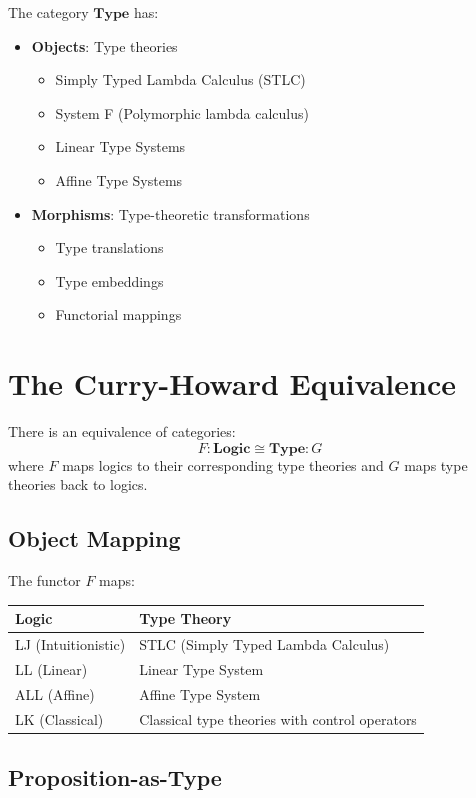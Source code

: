 The category $\mathbf{Type}$ has:
\begin{itemize}
    \item \textbf{Objects}: Type theories
    \begin{itemize}
        \item Simply Typed Lambda Calculus (STLC)
        \item System F (Polymorphic lambda calculus)
        \item Linear Type Systems
        \item Affine Type Systems
    \end{itemize}
    \item \textbf{Morphisms}: Type-theoretic transformations
    \begin{itemize}
        \item Type translations
        \item Type embeddings
        \item Functorial mappings
    \end{itemize}
\end{itemize}

\section*{The Curry-Howard Equivalence}

There is an equivalence of categories:
$$F: \mathbf{Logic} \cong \mathbf{Type}: G$$
where $F$ maps logics to their corresponding type theories and $G$ maps type theories back to logics.

\subsection*{Object Mapping}

The functor $F$ maps:
\begin{center}
\begin{tabular}{ll}
    \textbf{Logic} & \textbf{Type Theory} \\ \hline
    LJ (Intuitionistic) & STLC (Simply Typed Lambda Calculus) \\
    LL (Linear) & Linear Type System \\
    ALL (Affine) & Affine Type System \\
    LK (Classical) & Classical type theories with control operators
\end{tabular}
\end{center}

\subsection*{Proposition-as-Type}

